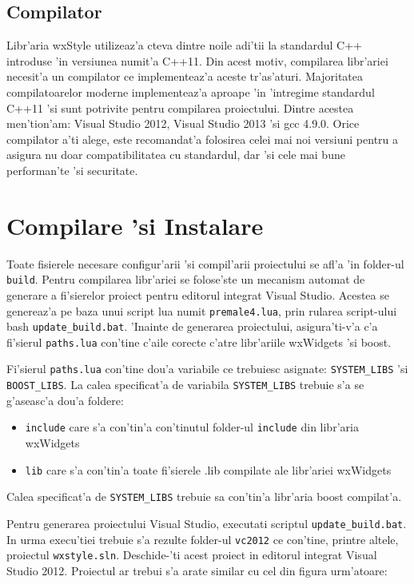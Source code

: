 \subsection{Compilator}

Libr'aria wxStyle utilizeaz'a c{\ia}teva dintre noile adi'tii la standardul C++ introduse 'in versiunea numit'a C++11. Din acest motiv, compilarea libr'ariei necesit'a un compilator ce implementeaz'a aceste tr'as'aturi. Majoritatea compilatoarelor moderne implementeaz'a aproape 'in 'intregime standardul C++11 'si sunt potrivite pentru compilarea proiectului. Dintre acestea men'tion'am: Visual Studio 2012, Visual Studio 2013 'si gcc 4.9.0. Orice compilator a'ti alege, este recomandat'a folosirea celei mai noi versiuni pentru a asigura nu doar compatibilitatea cu standardul, dar 'si cele mai bune performan'te 'si securitate.

\section{Compilare 'si Instalare}

Toate fisierele necesare configur'arii 'si compil'arii proiectului se afl'a 'in folder-ul \texttt{build}. Pentru compilarea libr'ariei se folose'ste un mecanism automat de generare a fi'sierelor proiect pentru editorul integrat Visual Studio. Acestea se genereaz'a pe baza unui script lua numit \texttt{premale4.lua}, prin rularea script-ului bash \texttt{update\_build.bat}. 'Inainte de generarea proiectului, asigura'ti-v'a c'a fi'sierul \texttt{paths.lua} con'tine c'aile corecte c'atre libr'ariile wxWidgets 'si boost.

Fi'sierul \texttt{paths.lua} con'tine dou'a variabile ce trebuiesc asignate: \texttt{SYSTEM\_LIBS} 'si \texttt{BOOST\_LIBS}. La calea specificat'a de variabila \texttt{SYSTEM\_LIBS} trebuie s'a se g'aseasc'a dou'a foldere: 
\begin{itemize}
\item \texttt{include} care s'a con'tin'a con'tinutul folder-ul \texttt{include} din libr'aria wxWidgets
\item \texttt{lib} care s'a con'tin'a toate fi'sierele .lib compilate ale libr'ariei wxWidgets
\end{itemize}

Calea specificat'a de \texttt{SYSTEM\_LIBS} trebuie sa con'tin'a libr'aria boost compilat'a.

Pentru generarea proiectului Visual Studio, executati scriptul \texttt{update\_build.bat}. In urma execu'tiei trebuie s'a rezulte folder-ul \texttt{vc2012} ce con'tine, printre altele, proiectul \texttt{wxstyle.sln}. Deschide-'ti acest proiect in editorul integrat Visual Studio 2012. Proiectul ar trebui s'a arate similar cu cel din figura urm'atoare:

